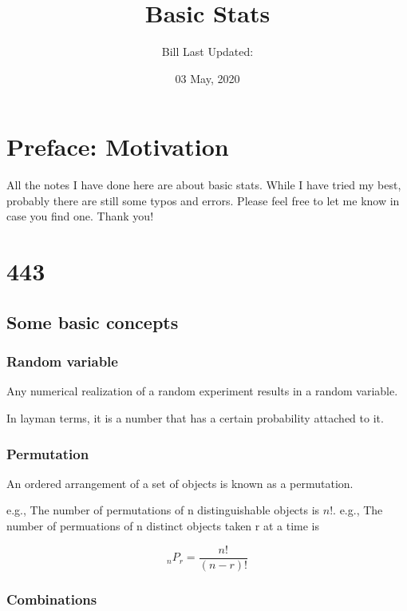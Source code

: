 \documentclass[]{book}
\title{Basic Stats}
\author{Bill Last Updated:}
\date{03 May, 2020}
\begin{document}
\maketitle

{
\setcounter{tocdepth}{1}
\tableofcontents
}
\hypertarget{my-section}{%
\chapter*{Preface: Motivation}\label{my-section}}

All the notes I have done here are about basic stats. While I have tried my best, probably there are still some typos and errors. Please feel free to let me know in case you find one. Thank you!

\hypertarget{section}{%
\chapter{443}\label{section}}

\hypertarget{some-basic-concepts}{%
\section{Some basic concepts}\label{some-basic-concepts}}

\hypertarget{random-variable}{%
\subsection{Random variable}\label{random-variable}}

Any numerical realization of a random experiment results in a random variable.

In layman terms, it is a number that has a certain probability attached to it.

\hypertarget{permutation}{%
\subsection{Permutation}\label{permutation}}

An ordered arrangement of a set of objects is known as a permutation.

e.g., The number of permutations of n distinguishable objects is \(n!\).
e.g., The number of permuations of n distinct objects taken r at a time is

\[_{n}P_r=\frac{n!}{(n-r)!}\]

\hypertarget{combinations}{%
\subsection{Combinations}\label{combinations}}
\end{document}
